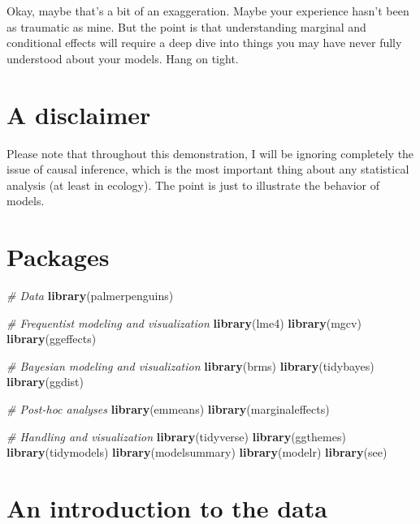 \documentclass[
]{article}
\newenvironment{Shaded}{\begin{snugshade}}{\end{snugshade}}
\newcommand{\CommentTok}[1]{\textcolor[rgb]{0.56,0.35,0.01}{\textit{#1}}}
\newcommand{\FunctionTok}[1]{\textcolor[rgb]{0.13,0.29,0.53}{\textbf{#1}}}
\newcommand{\NormalTok}[1]{#1}
\begin{document}
Okay, maybe that's a bit of an exaggeration. Maybe your experience
hasn't been as traumatic as mine. But the point is that understanding
marginal and conditional effects will require a deep dive into things
you may have never fully understood about your models. Hang on tight.

\hypertarget{a-disclaimer}{%
\section{A disclaimer}\label{a-disclaimer}}

Please note that throughout this demonstration, I will be ignoring
completely the issue of causal inference, which is the most important
thing about any statistical analysis (at least in ecology). The point is
just to illustrate the behavior of models.

\hypertarget{packages}{%
\section{Packages}\label{packages}}

\begin{Shaded}
\begin{Highlighting}[]
\CommentTok{\# Data}
\FunctionTok{library}\NormalTok{(palmerpenguins)}

\CommentTok{\# Frequentist modeling and visualization}
\FunctionTok{library}\NormalTok{(lme4)}
\FunctionTok{library}\NormalTok{(mgcv)}
\FunctionTok{library}\NormalTok{(ggeffects)}

\CommentTok{\# Bayesian modeling and visualization}
\FunctionTok{library}\NormalTok{(brms)}
\FunctionTok{library}\NormalTok{(tidybayes)}
\FunctionTok{library}\NormalTok{(ggdist)}

\CommentTok{\# Post{-}hoc analyses}
\FunctionTok{library}\NormalTok{(emmeans)}
\FunctionTok{library}\NormalTok{(marginaleffects)}

\CommentTok{\# Handling and visualization}
\FunctionTok{library}\NormalTok{(tidyverse)}
\FunctionTok{library}\NormalTok{(ggthemes)}
\FunctionTok{library}\NormalTok{(tidymodels)}
\FunctionTok{library}\NormalTok{(modelsummary)}
\FunctionTok{library}\NormalTok{(modelr)}
\FunctionTok{library}\NormalTok{(see)}
\end{Highlighting}
\end{Shaded}

\hypertarget{an-introduction-to-the-data}{%
\section{An introduction to the
data}\label{an-introduction-to-the-data}}
\end{document}
